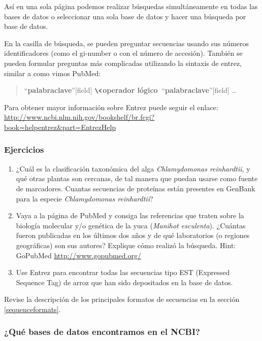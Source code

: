 \documentclass[letter,11pt]{book}
\begin{document}
Así en una sola página podemos realizar búsquedas simultáneamente en todas las bases de datos o seleccionar una sola base de datos y hacer una búsqueda por base de datos.

En la casilla de búsqueda, se pueden preguntar secuencias usando sus números identificadores (como el gi-number o con el número de accesión).  También se pueden formular preguntas más complicadas utilizando la sintaxis de entrez, similar a como vimos PubMed: 

\begin{quote}
``\textbf{palabraclave}''[field] $\<$\textbf{operador lógico} $\> $``\textbf{palabraclave}''[field] \ldots
\end{quote}

Para obtener mayor información sobre Entrez puede seguir el enlace: 
\url{http://www.ncbi.nlm.nih.gov/bookshelf/br.fcgi?book=helpentrez&part=EntrezHelp}

{\color{red}
\subsubsection{Ejercicios}

\begin{enumerate}
\item ¿Cuál es la clasificación taxonómica del alga \textit{Chlamydomonas reinhardtii}, y qué otras plantas son cercanas, de tal manera que puedan usarse como fuente de marcadores. Cuantas secuencias de proteínas están presentes en GenBank para la especie \textit{Chlamydomonas reinhardtii}?
\item Vaya a la página de PubMed y consiga las referencias que traten sobre la biología molecular y/o genética de la yuca (\textit{Manihot esculenta}).  ¿Cuántas fueron publicadas en  los últimos dos años y de qué laboratorios (o regiones geográficas) son sus autores? Explique cómo realizó la búsqueda. Hint: GoPubMed \url{http://www.gopubmed.org/}
\item Use Entrez para encontrar todas las secuencias tipo EST (Expressed Sequence Tag) de arroz que han sido depositados en la base de datos.
\end{enumerate}
}

Revise la descripción de los principales formatos de secuencias en la sección \ref{sequenceformats}.

\subsubsection{¿Qué bases de datos encontramos en el NCBI?}
\end{document}
